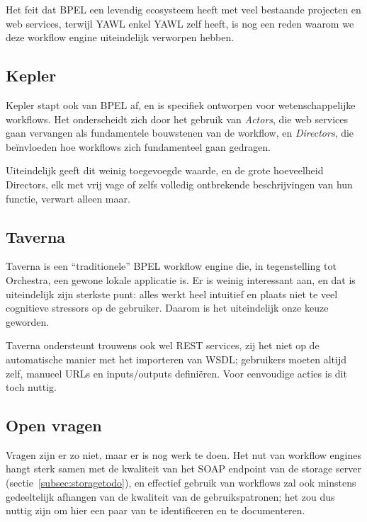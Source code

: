 \documentclass[a4paper]{article}
\begin{document}
Het feit dat \gls{BPEL} een levendig ecosysteem heeft met veel bestaande
projecten en web services, terwijl \gls{YAWL} enkel \gls{YAWL} zelf heeft, is
nog een reden waarom we deze workflow engine uiteindelijk verworpen hebben.

\subsection{Kepler}

Kepler stapt ook van \gls{BPEL} af, en is specifiek ontworpen voor
wetenschappelijke workflows. Het onderscheidt zich door het gebruik van
{\it Actors}, die web services gaan vervangen als fundamentele bouwstenen van
de workflow, en {\it Directors}, die be\"invloeden hoe workflows zich
fundamenteel gaan gedragen.

Uiteindelijk geeft dit weinig toegevoegde waarde, en de grote hoeveelheid
Directors, elk met vrij vage of zelfs volledig ontbrekende beschrijvingen van
hun functie, verwart alleen maar.

\subsection{Taverna}

Taverna is een ``traditionele'' \gls{BPEL} workflow engine die, in
tegenstelling tot Orchestra, een gewone lokale applicatie is. Er is weinig
interessant aan, en dat is uiteindelijk zijn sterkste punt: alles werkt heel
intuitief en plaats niet te veel cognitieve stressors op de gebruiker. Daarom
is het uiteindelijk onze keuze geworden.

Taverna ondersteunt trouwens ook wel REST services, zij het niet op de
automatische manier met het importeren van WSDL; gebruikers moeten altijd zelf,
manueel \gls{URL}s en inputs/outputs defini\"eren. Voor eenvoudige acties is
dit toch nuttig.

\subsection{Open vragen}

Vragen zijn er zo niet, maar er is nog werk te doen. Het nut van workflow
engines hangt sterk samen met de kwaliteit van het \gls{SOAP} endpoint van de
storage server (sectie~\ref{subsec:storagetodo}), en effectief gebruik van
workflows zal ook minstens gedeeltelijk afhangen van de kwaliteit van de
gebruikspatronen; het zou dus nuttig zijn om hier een paar van te identificeren
en te documenteren.
\end{document}
